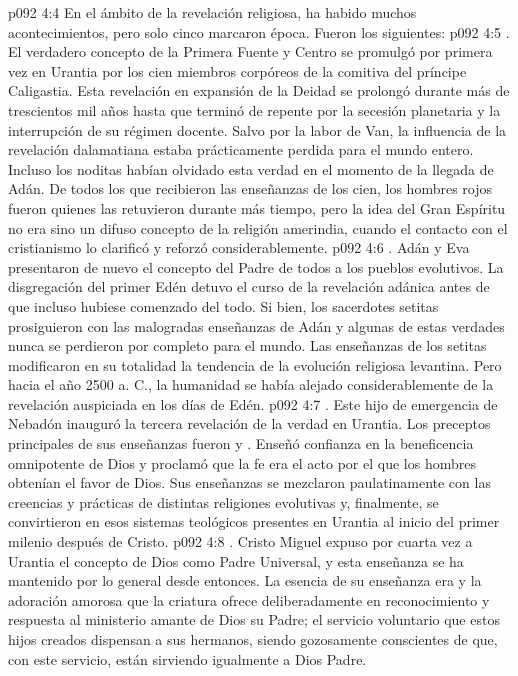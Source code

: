 \vs p092 4:4 \pc En el ámbito de la revelación religiosa, ha habido muchos acontecimientos, pero solo cinco marcaron época. Fueron los siguientes:
\vs p092 4:5 . El verdadero concepto de la Primera Fuente y Centro se promulgó por primera vez en Urantia por los cien miembros corpóreos de la comitiva del príncipe Caligastia. Esta revelación en expansión de la Deidad se prolongó durante más de trescientos mil años hasta que terminó de repente por la secesión planetaria y la interrupción de su régimen docente. Salvo por la labor de Van, la influencia de la revelación dalamatiana estaba prácticamente perdida para el mundo entero. Incluso los noditas habían olvidado esta verdad en el momento de la llegada de Adán. De todos los que recibieron las enseñanzas de los cien, los hombres rojos fueron quienes las retuvieron durante más tiempo, pero la idea del Gran Espíritu no era sino un difuso concepto de la religión amerindia, cuando el contacto con el cristianismo lo clarificó y reforzó considerablemente.
\vs p092 4:6 . Adán y Eva presentaron de nuevo el concepto del Padre de todos a los pueblos evolutivos. La disgregación del primer Edén detuvo el curso de la revelación adánica antes de que incluso hubiese comenzado del todo. Si bien, los sacerdotes setitas prosiguieron con las malogradas enseñanzas de Adán y algunas de estas verdades nunca se perdieron por completo para el mundo. Las enseñanzas de los setitas modificaron en su totalidad la tendencia de la evolución religiosa levantina. Pero hacia el año 2500 a. C., la humanidad se había alejado considerablemente de la revelación auspiciada en los días de Edén.
\vs p092 4:7 . Este hijo de emergencia de Nebadón inauguró la tercera revelación de la verdad en Urantia. Los preceptos principales de sus enseñanzas fueron  y . Enseñó confianza en la beneficencia omnipotente de Dios y proclamó que la fe era el acto por el que los hombres obtenían el favor de Dios. Sus enseñanzas se mezclaron paulatinamente con las creencias y prácticas de distintas religiones evolutivas y, finalmente, se convirtieron en esos sistemas teológicos presentes en Urantia al inicio del primer milenio después de Cristo.
\vs p092 4:8 . Cristo Miguel expuso por cuarta vez a Urantia el concepto de Dios como Padre Universal, y esta enseñanza se ha mantenido por lo general desde entonces. La esencia de su enseñanza era  y  la adoración amorosa que la criatura ofrece deliberadamente en reconocimiento y respuesta al ministerio amante de Dios su Padre; el servicio voluntario que estos hijos creados dispensan a sus hermanos, siendo gozosamente conscientes de que, con este servicio, están sirviendo igualmente a Dios Padre.
